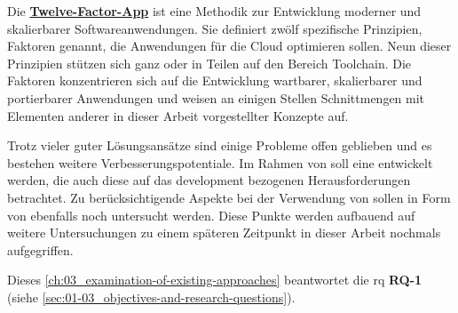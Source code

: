 Die \textbf{\hyperref[sec:03-05_concept-of-twelve-factor-app]{Twelve-Factor-App}} ist eine Methodik zur Entwicklung moderner und skalierbarer Softwareanwendungen. Sie definiert zwölf spezifische Prinzipien, Faktoren genannt, die Anwendungen für die Cloud optimieren sollen. Neun dieser Prinzipien stützen sich ganz oder in Teilen auf den Bereich Toolchain. Die Faktoren konzentrieren sich auf die Entwicklung wartbarer, skalierbarer und portierbarer Anwendungen und weisen an einigen Stellen Schnittmengen mit Elementen anderer in dieser Arbeit vorgestellter Konzepte auf.

Trotz vieler guter Lösungsansätze sind einige Probleme offen geblieben und es bestehen weitere Verbesserungspotentiale. Im Rahmen von  soll eine  entwickelt werden, die auch diese auf das \Gls{development} bezogenen Herausforderungen betrachtet. Zu berücksichtigende Aspekte bei der Verwendung von  sollen in Form von  ebenfalls noch untersucht werden. Diese Punkte werden aufbauend auf weitere Untersuchungen zu einem späteren Zeitpunkt in dieser Arbeit nochmals aufgegriffen.

Dieses \autoref{ch:03_examination-of-existing-approaches} beantwortet die \acrlong{rq} \textbf{RQ-1} (siehe \autoref{sec:01-03_objectives-and-research-questions}).
